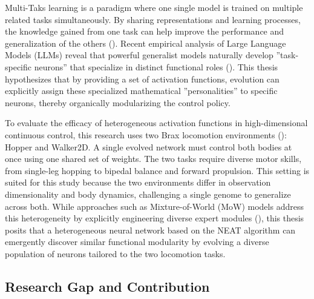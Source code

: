 \documentclass[12pt]{article}
\begin{document}

Multi-Taks learning is a paradigm where one single model is trained on multiple related tasks simultaneously. By sharing representations and learning processes, the knowledge gained from one task can help improve the performance and generalization of the others (\cite{zhang_survey_2021}). Recent empirical analysis of Large Language Models (LLMs) reveal that powerful generalist models naturally develop ”task-specific neurons”
that specialize in distinct functional roles (\cite{leng_understanding_2025}).
This thesis hypothesizes that by providing a set of activation functions, evolution
can explicitly assign these specialized mathematical ”personalities” to specific neurons,
thereby organically modularizing the control policy.

To evaluate the efficacy of heterogeneous activation functions in high-dimensional continuous control, this research uses two Brax locomotion environments (\cite{freeman_brax_2021}): Hopper and Walker2D. A single evolved network must control both bodies at once using one shared set of weights. The two tasks require diverse motor skills, from single-leg hopping to bipedal balance and forward propulsion. This setting is suited for this study because the two environments differ in observation dimensionality and body dynamics, challenging a single genome to generalize across both. While approaches such as Mixture-of-World (MoW) models address this heterogeneity by explicitly engineering diverse expert modules (\cite{zhang_mixture_2025}), this thesis posits that a heterogeneous neural network based on the NEAT algorithm can emergently discover similar functional modularity by evolving a diverse population of neurons tailored to the two locomotion tasks.

\subsection{Research Gap and Contribution}
\end{document}
